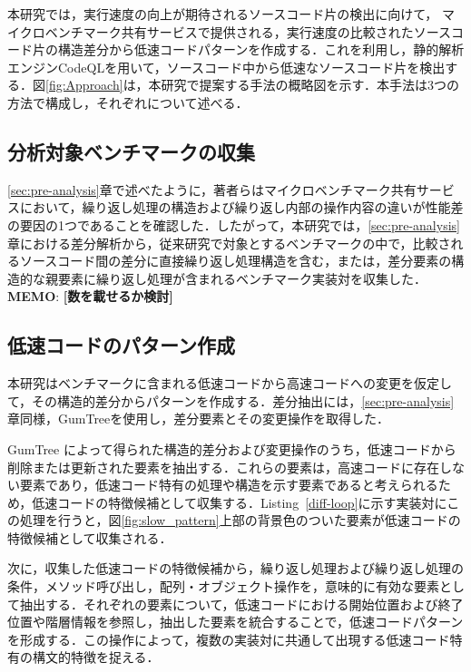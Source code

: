 \documentclass[submit,techrep,noauthor]{ipsj}
\newcommand{\memo}[1]{\colorbox{magenta!30}{{\bf MEMO}:}{\color{red!50} {\textbf{[#1]}}}}
\begin{document}
本研究では，実行速度の向上が期待されるソースコード片の検出に向けて，
マイクロベンチマーク共有サービスで提供される，実行速度の比較されたソースコード片の構造差分から低速コードパターンを作成する．これを利用し，静的解析エンジンCodeQLを用いて，ソースコード中から低速なソースコード片を検出する．図\ref{fig:Approach}は，本研究で提案する手法の概略図を示す．本手法は3つの方法で構成し，それぞれについて述べる．


\subsection{分析対象ベンチマークの収集}

\ref{sec:pre-analysis}章で述べたように，著者らはマイクロベンチマーク共有サービスにおいて，繰り返し処理の構造および繰り返し内部の操作内容の違いが性能差の要因の1つであることを確認した．したがって，本研究では，\ref{sec:pre-analysis}章における差分解析から，従来研究で対象とするベンチマークの中で，比較されるソースコード間の差分に直接繰り返し処理構造を含む，または，差分要素の構造的な親要素に繰り返し処理が含まれるベンチマーク実装対を収集した．\memo{数を載せるか検討}


\subsection{低速コードのパターン作成}
本研究はベンチマークに含まれる低速コードから高速コードへの変更を仮定して，その構造的差分からパターンを作成する．差分抽出には，\ref{sec:pre-analysis}章同様，GumTreeを使用し，差分要素とその変更操作を取得した．

GumTree によって得られた構造的差分および変更操作のうち，低速コードから削除または更新された要素を抽出する．これらの要素は，高速コードに存在しない要素であり，低速コード特有の処理や構造を示す要素であると考えられるため，低速コードの特徴候補として収集する．Listing~\ref{diff-loop}に示す実装対にこの処理を行うと，図\ref{fig:slow_pattern}上部の背景色のついた要素が低速コードの特徴候補として収集される．

次に，収集した低速コードの特徴候補から，繰り返し処理および繰り返し処理の条件，メソッド呼び出し，配列・オブジェクト操作を，意味的に有効な要素として抽出する．それぞれの要素について，低速コードにおける開始位置および終了位置や階層情報を参照し，抽出した要素を統合することで，低速コードパターンを形成する．この操作によって，複数の実装対に共通して出現する低速コード特有の構文的特徴を捉える．
\end{document}
